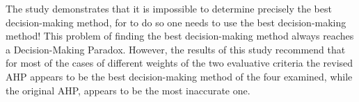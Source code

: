 The study \cite{DecisionMakingParadox} demonstrates that it is impossible to determine precisely the best decision-making method, for to do so one needs to use the best decision-making method! This problem of finding the best decision-making method always reaches a Decision-Making Paradox. However, the results of this study recommend that for most of the cases of different weights of the two evaluative criteria the revised AHP appears to be the best decision-making method of the four examined, while the original AHP, appears to be the most inaccurate one.
